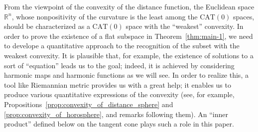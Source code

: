 \documentclass[12pt]{amsart}
\numberwithin{equation}{section}
\theoremstyle{plain}
\theoremstyle{definition}
\theoremstyle{remark}
\newcommand{\R}{{\mathbb R}}
\newcommand{\cat}[1]{\mathrm{CAT}(#1)}
\begin{document}
From the viewpoint of the convexity of the distance function, 
the Euclidean space $\R^n$, whose nonpositivity of the curvature is the
least among the $\cat{0}$ spaces, should be characterized as a $\cat{0}$
space with the ``weakest'' convexity. 
In order to prove the existence of a flat subspace in
Theorem~\ref{thm:main-1}, we need to develope a quantitative
approach to the recognition of the subset with the weakest convexity. 
It is plausible that, for example, the existence of solutions to a sort
of ``equation'' leads us to the goal;
indeed, it is achieved by considering harmonic maps and harmonic
functions as we will see. 
In order to realize this, a tool like Riemannian metric provides us with
a great help; it enables us to produce various quantitative expressions
of the convexity (see, for example, 
Propositions~\ref{prop:convexity_of_distance_sphere} and
\ref{prop:convexity_of_horosphere}, and remarks following them).  
An ``inner product'' defined below on the tangent cone 
plays such a role in this paper. 
\end{document}
